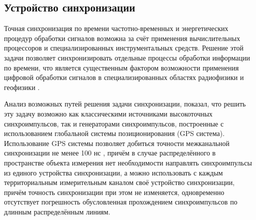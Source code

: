 \documentclass[a4paper, 14pt]{extarticle}
\begin{document}


  \subsection{Устройство синхронизации}\label{ssec:sync}

  Точная синхронизация по времени частотно-временных и энергетических процедур обработки
  сигналов возможна за счёт применения вычислительных процессоров и специализированных
  инструментальных средств. Решение этой задачи позволяет синхронизировать отдельные процессы
  обработки информации по времени, что является существенным фактором возможности применения
  цифровой обработки сигналов в специализированных областях радиофизики и геофизики \cite{stupin-methods}.

  Анализ возможных путей решения задачи синхронизации, показал, что решить эту задачу возможно как
  классическими источниками высокоточных синхроимпульсов, так и генераторами синхроимпульсов,
  построенные с использованием глобальной системы позиционирования (GPS система). Использование GPS
  системы позволяет добиться точности межканальной синхронизации не менее 100 нс \cite{lombardi-gps}, причём в случае
  распределённого в пространстве объекта измерения нет необходимости направлять синхроимпульсы из
  единого устройства синхронизации, а можно использовать с каждым территориальным измерительным
  каналом своё устройство синхронизации, причём точность синхронизации при этом не изменяется,
  одновременно отсутствует погрешность обусловленная прохождением синхроимпульсов по длинным
  распределённым линиям.
\end{document}
